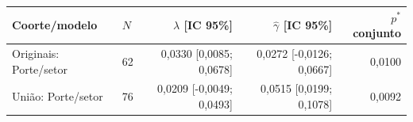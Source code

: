 \begin{tabular}{llrrr}
\toprule
Coorte/modelo & $N$ & $\widehat\lambda$ [IC 95\%] & $\widehat\gamma$ [IC 95\%] & $p^*$ conjunto\\
\midrule
Originais: Porte/setor & 62 & 0,0330 [0,0085; 0,0678] & 0,0272 [-0,0126; 0,0667] & 0,0100\\
União: Porte/setor & 76 & 0,0209 [-0,0049; 0,0493] & 0,0515 [0,0199; 0,1078] & 0,0092\\
\bottomrule
\end{tabular}
